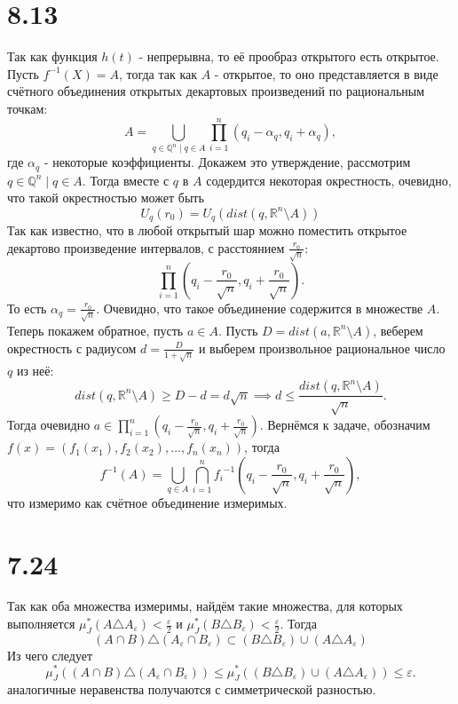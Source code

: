 \documentclass[12pt]{article}
\begin{document}
\section{8.13}
Так как функция $h(t)$ - непрерывна, то её прообраз открытого есть открытое. Пусть $f^{-1}(X) = A$, 
тогда так как $A$ - открытое, то оно представляется в виде счётного объединения открытых декартовых произведений 
по рациональным точкам: 
\[
    A = \bigcup_{q \in \mathbb{Q}^n \mid q \in A} \prod_{i = 1}^{n} \left( q_i - \alpha_q, q_i + \alpha_q \right), 
\]
где $\alpha_q$ - некоторые коэффициенты. 
Докажем это утверждение, рассмотрим $q \in \mathbb{Q}^n \mid q \in A$. Тогда вместе с $q$ в $A$ 
содердится некоторая окрестность, очевидно, что такой окрестностью может быть 
\[
    U_q(r_0) = U_q(dist(q, \mathbb{R}^n \setminus A))
\]
Так как известно, что в любой открытый шар можно поместить открытое декартово произведение интервалов, с расстоянием 
$\frac{r_0}{\sqrt{n}}$: 
\[
    \prod_{i=1}^{n} \left( q_i - \frac{r_0}{\sqrt{n}}, q_i + \frac{r_0}{\sqrt{n}} \right).
\]
То есть $\alpha_q = \frac{r_0}{\sqrt{n}}$. Очевидно, что такое объединение содержится в множестве $A$. 
Теперь покажем обратное, пусть $a \in A$. Пусть $D = dist(a, \mathbb{R}^n \setminus A)$, веберем окрестность 
с радиусом $d = \frac{D}{1 + \sqrt{n}}$ и выберем произвольное рациональное число $q$ из неё:
\[
    dist(q, \mathbb{R}^n \setminus A) \geq D - d = d \sqrt{n} \implies d \leq \frac{dist(q, \mathbb{R}^n \setminus A)}{\sqrt{n}}.  
\]   
Тогда очевидно $a \in \prod_{i=1}^{n} \left( q_i - \frac{r_0}{\sqrt{n}}, q_i + \frac{r_0}{\sqrt{n}} \right)$.
Вернёмся к задаче, обозначим $f(x) = (f_1(x_1), f_2(x_2), \dots, f_n(x_n))$, тогда
\[
    f^{-1}(A) = \bigcup_{q \in A} \bigcap_{i=1}^{n} {f_i}^{-1}\left( q_i - \frac{r_0}{\sqrt{n}}, q_i + \frac{r_0}{\sqrt{n}} \right),
\]
что измеримо как счётное объединение измеримых.

\section{7.24}
Так как оба множества измеримы, найдём такие множества, для которых выполняется $\mu_J^{\ast}(A \triangle A_{\varepsilon}) < \frac{\varepsilon}{2}$ и 
$\mu_J^{\ast}(B \triangle B_{\varepsilon}) < \frac{\varepsilon}{2}$. Тогда 
\[
    (A \cap B) \triangle (A_{\varepsilon}  \cap B_{\varepsilon}) \subset (B \triangle B_\varepsilon) \cup (A \triangle A_{\varepsilon} )
\]
Из чего следует 
\[
    \mu_J^{\ast}((A \cap B) \triangle (A_{\varepsilon}  \cap B_{\varepsilon})) \leq \mu_J^{\ast}((B \triangle B_\varepsilon) \cup (A \triangle A_{\varepsilon})) \leq \varepsilon.
\]
аналогичные неравенства получаются с симметрической разностью. 
\end{document}
